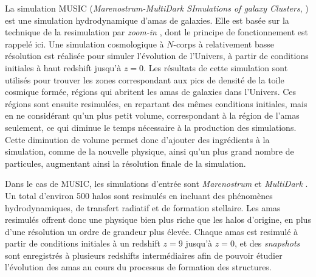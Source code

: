 La simulation MUSIC (\textit{Marenostrum-MultiDark SImulations of galaxy Clusters}, \cite{sembolini_music_2013}) est une simulation hydrodynamique d'amas de galaxies.
Elle est basée sur la technique de la resimulation par \textit{zoom-in} \cite{klypin_resolving_2001}, dont le principe de fonctionnement est rappelé ici.
Une simulation cosmologique à $N$-corps à relativement basse résolution  est réalisée pour simuler l'évolution de l'Univers, à partir de conditions initiales à haut redshift jusqu'à $z=0$.
Les résultats de cette simulation sont utilisés pour trouver les zones correspondant aux pics de densité de la toile cosmique formée, régions qui abritent les amas de galaxies dans l'Univers.
Ces régions sont ensuite resimulées, en repartant des mêmes conditions initiales, mais en ne considérant qu'un plus petit volume, correspondant à la région de l'amas seulement, ce qui diminue le temps nécessaire à la production des simulations.
Cette diminution de volume permet donc d'ajouter des ingrédients à la simulation, comme de la nouvelle physique, ainsi qu'un plus grand nombre de particules, augmentant ainsi la résolution finale de la simulation.

Dans le cas de MUSIC, les simulations d'entrée sont \textit{Marenostrum} \cite{gottlober_shape_2007} et \textit{MultiDark} \cite{prada_halo_2012}.
Un total d'environ 500 halos sont resimulés en incluant des phénomènes hydrodynamiques, de transfert radiatif et de formation stellaire.
Les amas resimulés offrent donc une physique bien plus riche que les halos d'origine, en plus d'une résolution un ordre de grandeur plus élevée.
Chaque amas est resimulé à partir de conditions initiales à un redshift $z=9$ jusqu'à $z=0$, et des \textit{snapshots} sont enregistrés à plusieurs redshifts intermédiaires afin de pouvoir étudier l'évolution des amas au cours du processus de formation des structures.

